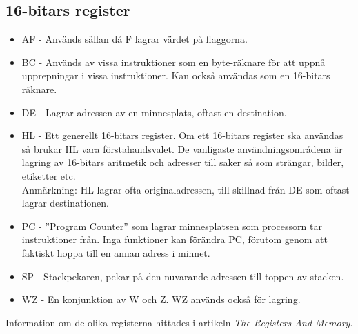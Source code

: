 \documentclass[main.tex]{subfiles}
\begin{document}
\subsection{16-bitars register}
\begin{itemize}
    \item AF - Används sällan då F lagrar värdet på flaggorna.
    \item BC - Används av vissa instruktioner som en byte-räknare för att uppnå
    upprepningar i vissa instruktioner. Kan också användas som en 16-bitars
    räknare.
    \item DE - Lagrar adressen av en minnesplats, oftast en destination.
    \item HL - Ett generellt 16-bitars register. Om ett 16-bitars register ska
    användas så brukar HL vara förstahandsvalet. De vanligaste
    användningsområdena är lagring av 16-bitars aritmetik och adresser till
    saker så som strängar, bilder, etiketter etc.\\
    Anmärkning: HL lagrar ofta originaladressen, till skillnad från DE som
    oftast lagrar destinationen.
    \item PC - ''Program Counter'' som lagrar minnesplatsen som processorn tar
    instruktioner från. Inga funktioner kan förändra PC, förutom genom att
    faktiskt hoppa till en annan adress i minnet.
    \item SP - Stackpekaren, pekar på den nuvarande adressen till toppen av stacken.
    \item WZ - En konjunktion av W och Z. WZ används också för lagring.
\end{itemize}

Information om de olika registerna hittades i artikeln  \emph{The Registers And Memory}. \cite{regsandmem}

\clearpage
\end{document}
